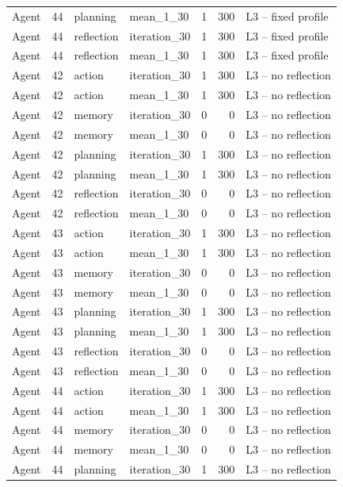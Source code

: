 \begin{table}[htbp!]
\begin{tabular}{lrllrrl}
Agent & 44 & planning & mean\_1\_30 & 1 & 300 & L3 -- fixed profile \\
Agent & 44 & reflection & iteration\_30 & 1 & 300 & L3 -- fixed profile \\
Agent & 44 & reflection & mean\_1\_30 & 1 & 300 & L3 -- fixed profile \\
Agent & 42 & action & iteration\_30 & 1 & 300 & L3 -- no reflection \\
Agent & 42 & action & mean\_1\_30 & 1 & 300 & L3 -- no reflection \\
Agent & 42 & memory & iteration\_30 & 0 & 0 & L3 -- no reflection \\
Agent & 42 & memory & mean\_1\_30 & 0 & 0 & L3 -- no reflection \\
Agent & 42 & planning & iteration\_30 & 1 & 300 & L3 -- no reflection \\
Agent & 42 & planning & mean\_1\_30 & 1 & 300 & L3 -- no reflection \\
Agent & 42 & reflection & iteration\_30 & 0 & 0 & L3 -- no reflection \\
Agent & 42 & reflection & mean\_1\_30 & 0 & 0 & L3 -- no reflection \\
Agent & 43 & action & iteration\_30 & 1 & 300 & L3 -- no reflection \\
Agent & 43 & action & mean\_1\_30 & 1 & 300 & L3 -- no reflection \\
Agent & 43 & memory & iteration\_30 & 0 & 0 & L3 -- no reflection \\
Agent & 43 & memory & mean\_1\_30 & 0 & 0 & L3 -- no reflection \\
Agent & 43 & planning & iteration\_30 & 1 & 300 & L3 -- no reflection \\
Agent & 43 & planning & mean\_1\_30 & 1 & 300 & L3 -- no reflection \\
Agent & 43 & reflection & iteration\_30 & 0 & 0 & L3 -- no reflection \\
Agent & 43 & reflection & mean\_1\_30 & 0 & 0 & L3 -- no reflection \\
Agent & 44 & action & iteration\_30 & 1 & 300 & L3 -- no reflection \\
Agent & 44 & action & mean\_1\_30 & 1 & 300 & L3 -- no reflection \\
Agent & 44 & memory & iteration\_30 & 0 & 0 & L3 -- no reflection \\
Agent & 44 & memory & mean\_1\_30 & 0 & 0 & L3 -- no reflection \\
Agent & 44 & planning & iteration\_30 & 1 & 300 & L3 -- no reflection \\

\end{tabular}
\end{table}
